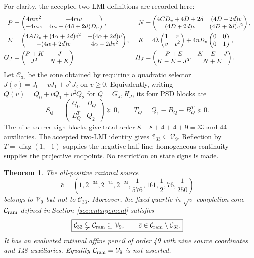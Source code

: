 \documentclass[10pt]{article}
\newtheorem{theorem}{Theorem}
\newcommand{\V}{\mathcal V_9}
\newcommand{\Cq}{\mathcal C_{33}}
\newcommand{\Cr}{\mathcal C_{\rm ram}}
\newcommand{\diag}{\operatorname{diag}}
\begin{document}
For clarity, the accepted two-LMI definitions are recorded here:
\begin{align}
P&=\begin{pmatrix}4mv^2&-4mv\\-4mv&4m+(4\beta+2d)D_v\end{pmatrix},&
N&=\begin{pmatrix}4CD_v+4D+2d&(4D+2d)v\\(4D+2d)v&(4D+2d)v^2\end{pmatrix},\notag\\
E&=\begin{pmatrix}4AD_v+(4\alpha+2d)v^2&-(4\alpha+2d)v\\
-(4\alpha+2d)v&4\alpha-2dv^2\end{pmatrix},&
K&=4\lambda\begin{pmatrix}1&v\\v&v^2\end{pmatrix}
       +4nD_v\begin{pmatrix}0&0\\0&1\end{pmatrix},            \label{eq:PNEK}\\
G_J&=\begin{pmatrix}P+K&J\\J^T&N+K\end{pmatrix},&
H_J&=\begin{pmatrix}P+E&K-E-J\\K-E-J^T&N+E\end{pmatrix}.  \label{eq:GH}
\end{align}
Let $\Cq$ be the cone obtained by requiring a quadratic selector
$J(v)=J_0+vJ_1+v^2J_2$ on $v\geq0$. Equivalently, writing
$Q(v)=Q_0+vQ_1+v^2Q_2$ for $Q=G_J,H_J$, its four PSD blocks are
\begin{equation}
S_Q=\begin{pmatrix}Q_0&B_Q\\B_Q^T&Q_2\end{pmatrix}\succeq0,
\qquad T_Q=Q_1-B_Q-B_Q^T\succeq0.                         \label{eq:primal}
\end{equation}
The nine source-sign blocks give total order $8+8+4+4+9=33$ and 44
auxiliaries. The accepted two-LMI identity gives $\Cq\subseteq\V$.
Reflection by $T=\diag(1,-1)$ supplies the negative half-line; homogeneous
continuity supplies the projective endpoints. No restriction on state signs
is made.

\begin{theorem}\label{thm:main}
The all-positive rational source
\begin{equation}
\boxed{\bar c=
 \left(1,2^{-34},2^{-14},2^{-24},\frac1{576},161,
                     \frac12,76,\frac1{250}\right)}         \label{eq:cbar}
\end{equation}
belongs to $\V$ but not to $\Cq$. Moreover, the fixed quartic-in-$\sqrt v$
completion cone $\Cr$ defined in Section~\ref{sec:enlargement} satisfies
\[
\boxed{\Cq\subsetneqq\Cr\subseteq\V,\qquad
       \bar c\in\Cr\setminus\Cq.}
\]
It has an evaluated rational affine pencil of order 49 with nine source
coordinates and 148 auxiliaries. Equality $\Cr=\V$ is not asserted.
\end{theorem}
\end{document}
